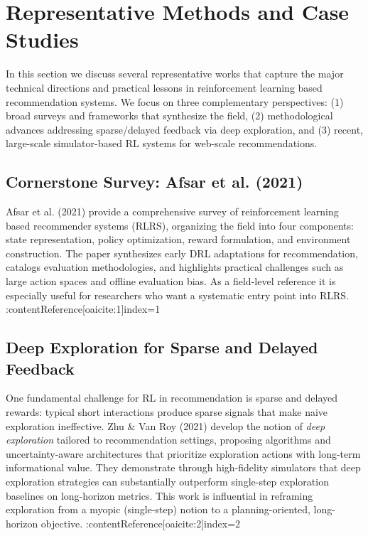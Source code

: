 \section{Representative Methods and Case Studies}

In this section we discuss several representative works that capture the major technical directions and practical lessons in reinforcement learning based recommendation systems. We focus on three complementary perspectives: (1) broad surveys and frameworks that synthesize the field, (2) methodological advances addressing sparse/delayed feedback via deep exploration, and (3) recent, large-scale simulator-based RL systems for web-scale recommendations.

\subsection{Cornerstone Survey: Afsar et al. (2021)}

Afsar et al. (2021) provide a comprehensive survey of reinforcement learning based recommender systems (RLRS), organizing the field into four components: state representation, policy optimization, reward formulation, and environment construction. The paper synthesizes early DRL adaptations for recommendation, catalogs evaluation methodologies, and highlights practical challenges such as large action spaces and offline evaluation bias. As a field-level reference it is especially useful for researchers who want a systematic entry point into RLRS. \cite{Afsar2021Survey} :contentReference[oaicite:1]{index=1}

\subsection{Deep Exploration for Sparse and Delayed Feedback}

One fundamental challenge for RL in recommendation is sparse and delayed rewards: typical short interactions produce sparse signals that make naive exploration ineffective. Zhu \& Van Roy (2021) develop the notion of \emph{deep exploration} tailored to recommendation settings, proposing algorithms and uncertainty-aware architectures that prioritize exploration actions with long-term informational value. They demonstrate through high-fidelity simulators that deep exploration strategies can substantially outperform single-step exploration baselines on long-horizon metrics. This work is influential in reframing exploration from a myopic (single-step) notion to a planning-oriented, long-horizon objective. \cite{Zhu2021DeepExploration} :contentReference[oaicite:2]{index=2}

